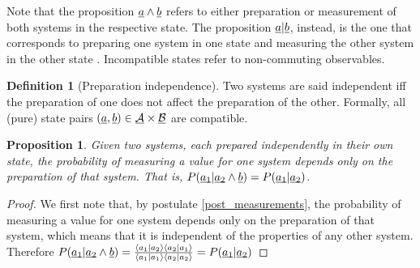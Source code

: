 \documentclass[aps,prl,amsmath,amssymb,twocolumn,nofootinbib]{revtex4}
\theoremstyle{plain}
\newtheorem{prop}[thrm]{Proposition}
\theoremstyle{definition}
\newtheorem{defn}[thrm]{Definition}
\theoremstyle{remark}
\newcommand{\pj}[1] {\underbar{$#1$}}
\def\>{\rangle}
\def\<{\langle}
\begin{document}
	{Note that the proposition $\pj{a} \wedge \pj{b}$ refers to either
		preparation or measurement of both systems  in the respective state.
		The proposition $\pj{a} | \pj{b}$, instead, is the one that
		corresponds to preparing one system in one state and measuring the
		other system in the other state \cite{cox}. Incompatible states
		refer to non-commuting observables.}
	
	\begin{defn}[Preparation independence]\label{def_indep}
		Two systems are said independent iff the preparation of one does not affect the preparation of the other. Formally, all (pure) state pairs $(\pj{a}, \pj{b}) \in \pj{\mathcal{A}}\times \pj{\mathcal{B}}$ are compatible.
	\end{defn}
	
	\begin{prop}\label{prop_singleBorn}
		Given two systems, each prepared independently in their own state, the probability of measuring a value for one system depends only on the preparation of that system. That is, $P(\pj{a_1}|\pj{a_2}\wedge \pj{b})=P(\pj{a_1}|\pj{a_2})$.
	\end{prop}
	\begin{proof}
		We first note that, by postulate \ref{post_measurements}, the probability of measuring a value for one system depends only on the preparation of that system, which means that it is independent of the properties of any other system. Therefore $P(\pj{a_1} | \pj{a_2} \wedge \pj{b}) = \frac{\<a_1| a_2 \> \< a_2 |a_1\>}{\< a_1 | a_1 \>\< a_2 | a_2 \>} = P(\pj{a_1} | \pj{a_2})$
	\end{proof}
	
\end{document}
